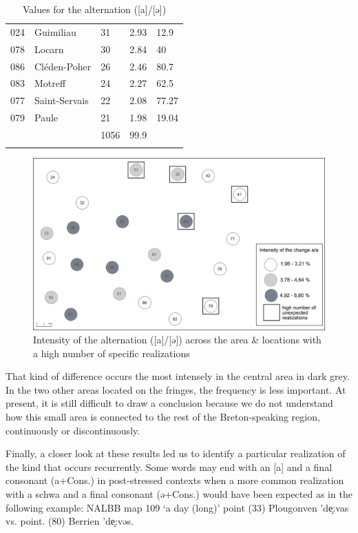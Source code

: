 \documentclass[output=paper]{LSP/langsci}
\begin{document}
\begin{table}
{\begin{tabular}{lllll}
 024 & Guimiliau & 31 & 2.93 & 12.9\\
 078 & Locarn & 30 & 2.84 & 40\\
 086 & Cléden-Poher & 26 & 2.46 & 80.7\\
 083 & Motreff & 24 & 2.27 & 62.5\\
 077 & Saint-Servais & 22 & 2.08 & 77.27\\
 079 & Paule & 21 & 1.98 & 19.04\\
\midrule
&  & 1056 & 99.9 & \\
\lspbottomrule
\end{tabular}
}
\caption{Values for the alternation ([a]/[ə])}
\label{tab:6}
\end{table}

\begin{figure}
\includegraphics[width=\textwidth]{illustrations/brun_etal_fig6}
\caption{Intensity of the alternation ([a]/[ə]) across the area \& locations with a high number of specific realizations}
\label{fig:6}
\end{figure}

That kind of difference occurs the most intensely in the central area in dark grey. In the two other areas located on the fringes, the frequency is less important. At present, it is still difficult to draw a conclusion because we do not understand how this small area is connected to the rest of the Breton-speaking region, continuously or discontinuously.

Finally, a closer look at these results led us to identify a particular realization of the kind that occurs recurrently. Some words may end with an [a] and a final consonant (a+Cons.) in post-stressed contexts when a more common realization with a schwa and a final consonant (ə+Cons.) would have been expected as in the following example: NALBB map 109 ‘a day (long)’ point (33) Plougonven 'de̝:vas vs. point. (80) Berrien 'de̝:vəs.
\end{document}
